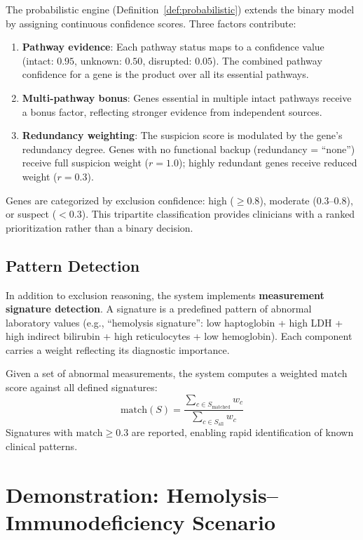 \documentclass[12pt,a4paper]{article}
\begin{document}
The probabilistic engine (Definition~\ref{def:probabilistic}) extends the binary model by assigning continuous confidence scores. Three factors contribute:

\begin{enumerate}
    \item \textbf{Pathway evidence}: Each pathway status maps to a confidence value (intact: $0.95$, unknown: $0.50$, disrupted: $0.05$). The combined pathway confidence for a gene is the product over all its essential pathways.
    \item \textbf{Multi-pathway bonus}: Genes essential in multiple intact pathways receive a bonus factor, reflecting stronger evidence from independent sources.
    \item \textbf{Redundancy weighting}: The suspicion score is modulated by the gene's redundancy degree. Genes with no functional backup (redundancy = ``none'') receive full suspicion weight ($r = 1.0$); highly redundant genes receive reduced weight ($r = 0.3$).
\end{enumerate}

Genes are categorized by exclusion confidence: high ($\geq 0.8$), moderate ($0.3$--$0.8$), or suspect ($< 0.3$). This tripartite classification provides clinicians with a ranked prioritization rather than a binary decision.

\subsection{Pattern Detection}

In addition to exclusion reasoning, the system implements \textbf{measurement signature detection}. A signature is a predefined pattern of abnormal laboratory values (e.g., ``hemolysis signature'': low haptoglobin + high LDH + high indirect bilirubin + high reticulocytes + low hemoglobin). Each component carries a weight reflecting its diagnostic importance.

Given a set of abnormal measurements, the system computes a weighted match score against all defined signatures:
\begin{equation}
    \text{match}(S) = \frac{\sum_{c \in S_{\text{matched}}} w_c}{\sum_{c \in S_{\text{all}}} w_c}
\end{equation}
Signatures with $\text{match} \geq 0.3$ are reported, enabling rapid identification of known clinical patterns.

\section{Demonstration: Hemolysis--Immunodeficiency Scenario}
\label{sec:demo}
\end{document}
